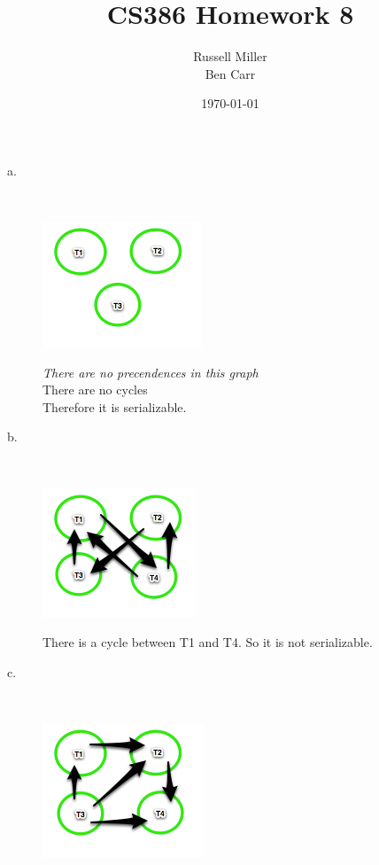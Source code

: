 \documentclass{article}
\title{CS386 Homework 8}
\author{Russell Miller\\
Ben Carr}
\date{\today}
\begin{document}
\maketitle

\section{}
\begin{description}
\item[a.]
\ \\
\begin{center}
\includegraphics{1a.png}
\end{center}
\emph{There are no precendences in this graph}\\
There are no cycles\\
Therefore it is serializable.
\item[b.]
\ \\
\begin{center}
\includegraphics{1b.png}
\end{center}
There is a cycle between T1 and T4. So it is not serializable.
\pagebreak
\item[c.]
\ \\
\begin{center}
\includegraphics{1c.png}
\end{center}

\end{description}
\end{document}
